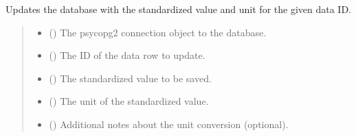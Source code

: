 \documentclass[letterpaper,10pt,english]{sphinxmanual}
\begin{document}
\begin{fulllineitems}
\label{\detokenize{modules.data_storage:modules.data_storage.llm_standardize.update_standardized}}
\pysigstartsignatures
\pysiglinewithargsret
{}
{\sphinxparamcomma {}\sphinxparamcomma {}\sphinxparamcomma {}\sphinxparamcomma {}}
{}
\pysigstopsignatures
\sphinxAtStartPar
Updates the database with the standardized value and unit for the given data ID.
\begin{quote}\begin{description}
\begin{itemize}
\item {} 
\sphinxAtStartPar
{} () \textendash{} The psycopg2 connection object to the database.

\item {} 
\sphinxAtStartPar
{} () \textendash{} The ID of the data row to update.

\item {} 
\sphinxAtStartPar
{} () \textendash{} The standardized value to be saved.

\item {} 
\sphinxAtStartPar
{} () \textendash{} The unit of the standardized value.

\item {} 
\sphinxAtStartPar
{} (\sphinxstyleliteralemphasis{\sphinxupquote{, }}) \textendash{} Additional notes about the unit conversion (optional).

\end{itemize}

\end{description}\end{quote}

\end{fulllineitems}
\end{document}
